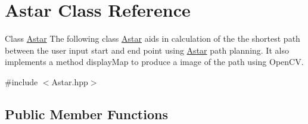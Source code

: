 \hypertarget{classAstar}{}\section{Astar Class Reference}
\label{classAstar}


Class \hyperlink{classAstar}{Astar} The following class \hyperlink{classAstar}{Astar} aids in calculation of the the shortest path between the user input start and end point using \hyperlink{classAstar}{Astar} path planning. It also implements a method display\+Map to produce a image of the path using Open\+CV.  




{\ttfamily \#include $<$Astar.\+hpp$>$}

\subsection*{Public Member Functions}

